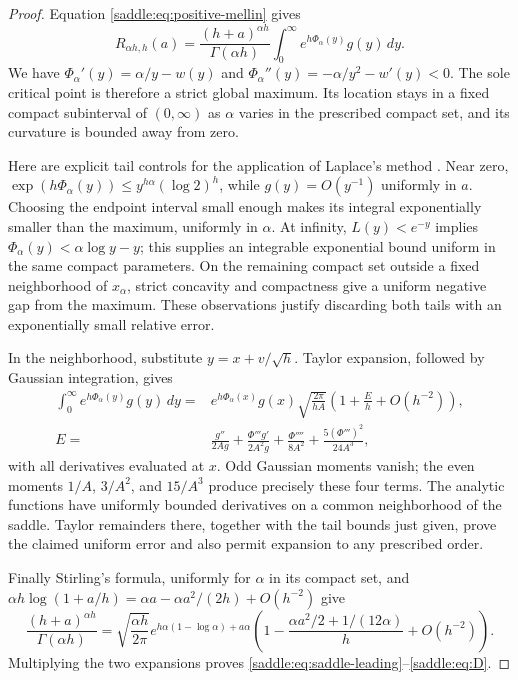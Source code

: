 \begin{proof}
Equation \eqref{saddle:eq:positive-mellin} gives
\[
 R_{\alpha h,h}(a)
 =\frac{(h+a)^{\alpha h}}{\Gamma(\alpha h)}
 \int_0^\infty e^{h\Phi_\alpha(y)}g(y)\,dy.
\]
We have
$\Phi_\alpha'(y)=\alpha/y-w(y)$ and
$\Phi_\alpha''(y)=-\alpha/y^2-w'(y)<0$.
The sole critical point is therefore a strict global maximum.
Its location stays in a fixed compact subinterval of $(0,\infty)$ as
$\alpha$ varies in the prescribed compact set, and its curvature is
bounded away from zero.

Here are explicit tail controls for the application of Laplace's method
\cite[\S2.3(iii)]{saddle:DLMFLaplace}
\cite[Section 2.3(iii)]{saddle:DLMFLaplace}. Near zero,
$\exp(h\Phi_\alpha(y))\leq y^{h\alpha}(\log2)^h$,
while $g(y)=O(y^{-1})$ uniformly in $a$. Choosing the endpoint interval
small enough makes its integral exponentially smaller than the maximum,
uniformly in $\alpha$. At infinity, $L(y)<e^{-y}$ implies
$\Phi_\alpha(y)<\alpha\log y-y$; this supplies an integrable
exponential bound uniform in the same compact parameters. On the
remaining compact set outside a fixed neighborhood of $x_\alpha$,
strict concavity and compactness give a uniform negative gap from the
maximum. These observations justify discarding both tails with an
exponentially small relative error.

In the neighborhood, substitute
$y=x+v/\sqrt h$. Taylor expansion, followed by Gaussian integration,
gives
\begin{align*}
 \int_0^\infty e^{h\Phi_\alpha(y)}g(y)\,dy
 ={}&e^{h\Phi_\alpha(x)}g(x)
 \sqrt{\frac{2\pi}{hA}}\left(1+\frac Eh+O(h^{-2})\right),\\
 E={}&\frac{g''}{2Ag}
 +\frac{\Phi'''g'}{2A^2g}
 +\frac{\Phi''''}{8A^2}
 +\frac{5(\Phi''')^2}{24A^3},
\end{align*}
with all derivatives evaluated at $x$. Odd Gaussian moments vanish;
the even moments $1/A$, $3/A^2$, and $15/A^3$ produce precisely these
four terms. The analytic functions have uniformly bounded derivatives
on a common neighborhood of the saddle. Taylor remainders there,
together with the tail bounds just given, prove the claimed uniform
error and also permit expansion to any prescribed order.

Finally Stirling's formula, uniformly for $\alpha$ in its compact set,
and $\alpha h\log(1+a/h)=\alpha a-\alpha a^2/(2h)+O(h^{-2})$
give
\[
 \frac{(h+a)^{\alpha h}}{\Gamma(\alpha h)}
 =\sqrt{\frac{\alpha h}{2\pi}}
 e^{h\alpha(1-\log\alpha)+a\alpha}
 \left(1-\frac{\alpha a^2/2+1/(12\alpha)}h+O(h^{-2})\right).
\]
Multiplying the two expansions proves
\eqref{saddle:eq:saddle-leading}--\eqref{saddle:eq:D}.
\end{proof}

